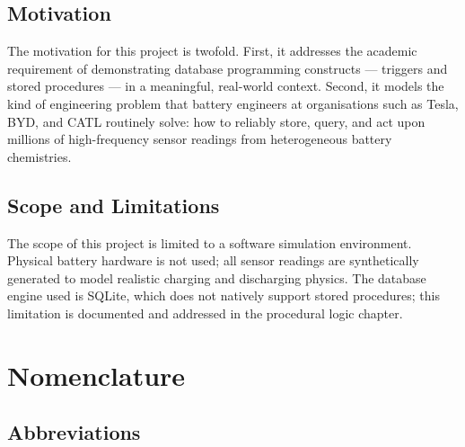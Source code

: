 \documentclass[12pt, a4paper]{report}
\begin{document}
\section{Motivation}
The motivation for this project is twofold. First, it addresses the academic requirement of demonstrating database programming constructs — triggers and stored procedures — in a meaningful, real-world context. Second, it models the kind of engineering problem that battery engineers at organisations such as Tesla, BYD, and CATL routinely solve: how to reliably store, query, and act upon millions of high-frequency sensor readings from heterogeneous battery chemistries.

\section{Scope and Limitations}
The scope of this project is limited to a software simulation environment. Physical battery hardware is not used; all sensor readings are synthetically generated to model realistic charging and discharging physics. The database engine used is SQLite, which does not natively support stored procedures; this limitation is documented and addressed in the procedural logic chapter.

\newpage

\chapter*{Nomenclature}

\section*{Abbreviations}
\end{document}
